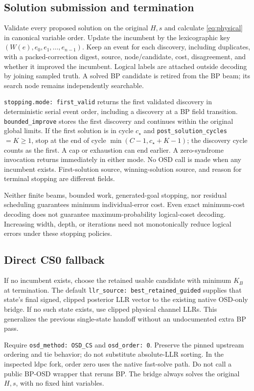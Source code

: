 \documentclass[11pt,a4paper]{article}
\newcommand{\code}[1]{\nolinkurl{#1}}
\begin{document}
\subsection{Solution submission and termination}
Validate every proposed solution on the original $H,s$ and calculate \eqref{eq:physical} in canonical variable order. Update the incumbent by the lexicographic key $(W(e),e_0,e_1,\ldots,e_{n-1})$. Keep an event for each discovery, including duplicates, with a packed-correction digest, source, node/candidate, cost, disagreement, and whether it improved the incumbent. Logical labels are attached outside decoding by joining sampled truth. A solved BP candidate is retired from the BP beam; its search node remains independently searchable.

\code{stopping.mode: first_valid} returns the first validated discovery in deterministic serial event order, including a discovery at a BP field transition. \code{bounded_improve} stores the first discovery and continues within the original global limits. If the first solution is in cycle $c_\star$ and \code{post_solution_cycles}$=K\geq1$, stop at the end of cycle $\min(C-1,c_\star+K-1)$; the discovery cycle counts as the first. A cap or exhaustion can end earlier. A zero-syndrome invocation returns immediately in either mode. No OSD call is made when any incumbent exists. First-solution source, winning-solution source, and reason for terminal stopping are different fields.

Neither finite beams, bounded work, generated-goal stopping, nor residual scheduling guarantees minimum individual-error cost. Even exact minimum-cost decoding does not guarantee maximum-probability logical-coset decoding. Increasing width, depth, or iterations need not monotonically reduce logical errors under these stopping policies.

\subsection{Direct CS0 fallback}
If no incumbent exists, choose the retained usable candidate with minimum $K_B$ at termination. The default \code{llr_source: best_retained_guided} supplies that state's final signed, clipped posterior LLR vector to the existing native OSD-only bridge. If no such state exists, use clipped physical channel LLRs. This generalizes the previous single-state handoff without an undocumented extra BP pass.

Require \code{osd_method: OSD_CS} and \code{osd_order: 0}. Preserve the pinned upstream ordering and tie behavior; do not substitute absolute-LLR sorting. In the inspected ldpc fork, order zero uses the native fast-solve path. Do not call a public BP-OSD wrapper that reruns BP. The bridge always solves the original $H,s$, with no fixed hint variables.
\end{document}

